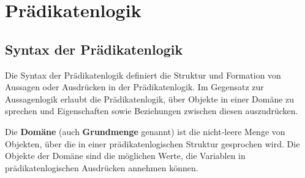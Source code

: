 \documentclass[main.tex]{subfiles}
\begin{document}
\section{Prädikatenlogik}
\subsection{Syntax der Prädikatenlogik}

Die Syntax der Prädikatenlogik definiert die Struktur und Formation von Aussagen oder Ausdrücken in der Prädikatenlogik. Im Gegensatz zur Aussagenlogik erlaubt die Prädikatenlogik, über Objekte in einer Domäne zu sprechen und Eigenschaften sowie Beziehungen zwischen diesen auszudrücken.

\begin{definition}[Domäne]
Die \textbf{Domäne} (auch \textbf{Grundmenge} genannt) ist die nicht-leere Menge von Objekten, über die in einer prädikatenlogischen Struktur gesprochen wird. Die Objekte der Domäne sind die möglichen Werte, die Variablen in prädikatenlogischen Ausdrücken annehmen können.
\end{definition}
\end{document}
